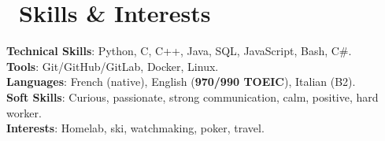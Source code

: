 \documentclass[letterpaper,11pt]{article}
\begin{document}
\section*{\small \faTools\ \large Skills \& Interests}
\begin{itemize}[leftmargin=0.15in, label={}]
  \small{\item{
    \textbf{Technical Skills}{: Python, C, C++, Java, SQL, JavaScript, Bash, C\#.} \\
    \textbf{Tools}{: Git/GitHub/GitLab, Docker, Linux.} \\
    \textbf{Languages}{: French (native), English (\textbf{970/990 TOEIC}), Italian (B2).} \\
    \textbf{Soft Skills}{: Curious, passionate, strong communication, calm, positive, hard worker.} \\
    \textbf{Interests}{: Homelab, ski, watchmaking, poker, travel.}
  }}
\end{itemize}
\end{document}
